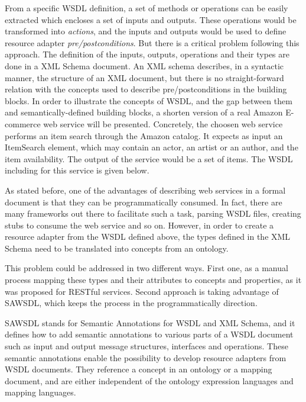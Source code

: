 \documentclass{fast_latex}
\begin{document}
From a specific WSDL definition, a set of methods or operations can be easily extracted which encloses a set of inputs and outputs. These operations would be transformed into \emph{actions}, and the inputs and outputs would be used to define resource adapter \emph{pre/postconditions}. But there is a critical problem following this approach. The definition of the inputs, outputs, operations and their types are done in a XML Schema document. An XML schema describes, in a syntactic manner, the structure of an XML document, but there is no straight-forward relation with the concepts used to describe pre/postconditions in the building blocks. In order to illustrate the concepts of WSDL, and the gap between them and semantically-defined building blocks, a shorten version of a real Amazon E-commerce web service will be presented. Concretely, the choosen web service performs an item search through the Amazon catalog. It expects as input an ItemSearch element, which may contain an actor, an artist or an author, and the item availability. The output of the service would be a set of items. The WSDL including for this service is given below.

\singlespacing
\begin{small}

\end{small}
\doublespacing

As stated before, one of the advantages of describing web services in a formal document is that they can be programmatically consumed. In fact, there are many frameworks out there to facilitate such a task, parsing WSDL files, creating stubs to consume the web service and so on. However, in order to create a resource adapter from the WSDL defined above, the types defined in the XML Schema need to be translated into concepts from an ontology.

This problem could be addressed in two different ways. First one, as a manual process mapping these types and their attributes to concepts and properties, as it was proposed for RESTful services. Second approach is taking advantage of SAWSDL, which keeps the process in the programmatically direction.

SAWSDL \cite{sawsdl} stands for Semantic Annotations for WSDL and XML Schema, and it defines how to add semantic annotations to various parts of a WSDL document such as input and output message structures, interfaces and operations. These semantic annotations enable the possibility to develop resource adapters from WSDL documents. They reference a concept in an ontology or a mapping document, and are either independent of the ontology expression languages and mapping languages.
\end{document}
